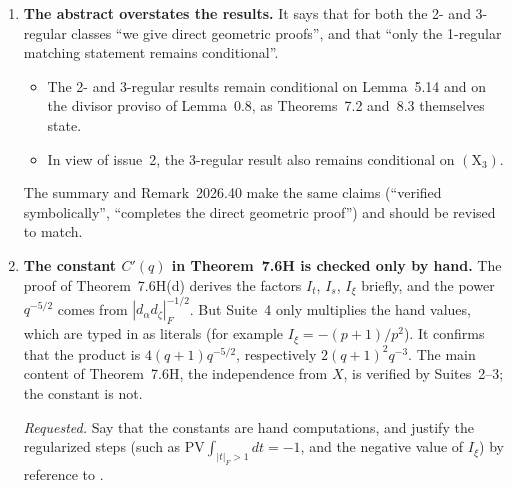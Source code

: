 \documentclass[12pt,letterpaper]{article}
\begin{document}
\begin{enumerate}[leftmargin=1.5em]
\emph{The constants.} The valuation-shell sums giving $B_1'(1)B_2(1)$ are
asserted, not derived. Suite~6D encodes the final shell formulas, so it checks
their arithmetic but not that they equal the integrals.

\emph{Requested.}
\begin{itemize}[leftmargin=1.5em]
\item Either supply a complete proof, or downgrade Theorem~8.3H to a
proposition marked as a sketch.
\item Restore Theorem~8.3 to ``conditional on $(\mathrm X_3)$, Lemma~5.14
and Lemma~0.8''.
\item Keep Propositions~8.3F--8.3G, whose algebra the script verifies, and
list the missing steps in Remark~2026.40.
\end{itemize}

\item \textbf{The abstract overstates the results.} It says that for both
the 2- and 3-regular classes ``we give direct geometric proofs'', and that
``only the 1-regular matching statement remains conditional''.
\begin{itemize}[leftmargin=1.5em]
\item The 2- and 3-regular results remain conditional on Lemma~5.14 and on
the divisor proviso of Lemma~0.8, as Theorems~7.2 and~8.3 themselves state.
\item In view of issue~2, the 3-regular result also remains conditional on
$(\mathrm X_3)$.
\end{itemize}
The summary and Remark~2026.40 make the same claims (``verified
symbolically'', ``completes the direct geometric proof'') and should be
revised to match.

\item \textbf{The constant $C'(q)$ in Theorem~7.6H is checked only by hand.}
The proof of Theorem~7.6H(d) derives the factors $I_t$, $I_s$, $I_\xi$ briefly,
and the power $q^{-5/2}$ comes from $|d_\alpha d_\zeta|_F^{-1/2}$. But Suite~4
only multiplies the hand values, which are typed in as literals (for example
$I_\xi=-(p+1)/p^2$). It confirms that the product is $4(q+1)q^{-5/2}$,
respectively $2(q+1)^2q^{-3}$. The main content of Theorem~7.6H, the
independence from $X$, is verified by Suites~2--3; the constant is not.

\emph{Requested.} Say that the constants are hand computations, and justify the
regularized steps (such as $\mathrm{PV}\int_{|t|_F>1}dt=-1$, and the negative
value of $I_\xi$) by reference to \cite{LS83}.
\end{enumerate}
\end{document}
